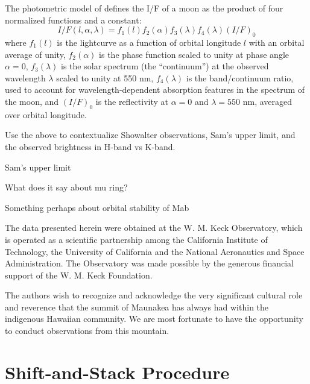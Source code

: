 \documentclass[preprint]{aastex631}
\begin{document}
The photometric model of \citet{karkoschka01} defines the I/F of a moon as the product of four normalized functions and a constant:
\begin{equation}
	\label{eq:if}
	I/F(l, \alpha, \lambda) = f_1(l) f_2(\alpha) f_3(\lambda) f_4(\lambda) (I/F)_0
\end{equation}
where $f_1(l)$ is the lightcurve as a function of orbital longitude $l$ with an orbital average of unity, $f_2(\alpha)$ is the phase function scaled to unity at phase angle $\alpha = 0$, $f_3(\lambda)$ is the solar spectrum (the ``continuum'') at the observed wavelength $\lambda$ scaled to unity at 550 nm, $f_4(\lambda)$ is the band/continuum ratio, used to account for wavelength-dependent absorption features in the spectrum of the moon, and $(I/F)_0$ is the reflectivity at $\alpha = 0$ and $\lambda = 550$ nm, averaged over orbital longitude.

Use the above to contextualize Showalter observations, Sam's upper limit, and the observed brightness in H-band vs K-band.

Sam's upper limit

What does it say about mu ring?

Something perhaps about orbital stability of Mab

\begin{acknowledgements}

The data presented herein were obtained at the W. M. Keck Observatory, which is operated as a scientific partnership among the California Institute of Technology, the University of California and the National Aeronautics and Space Administration. The Observatory was made possible by the generous financial support of the W. M. Keck Foundation.

The authors wish to recognize and acknowledge the very significant cultural role and reverence that the summit of Maunakea has always had within the indigenous Hawaiian community.  We are most fortunate to have the opportunity to conduct observations from this mountain.

\end{acknowledgements}

\appendix

\section{Shift-and-Stack Procedure}
\label{s:shiftandstack}
\end{document}

